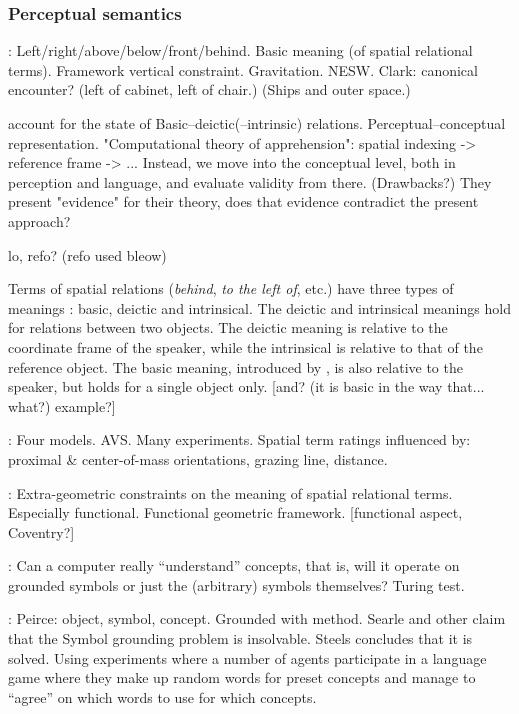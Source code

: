 \documentclass[11pt, a4paper]{article}
\begin{document}
\subsubsection{Perceptual semantics}

\cite{Garnhamunifiedtheorymeaning1989}:
Left/right/above/below/front/behind.
Basic meaning (of spatial relational terms).
Framework vertical constraint.
Gravitation. NESW.
Clark: canonical encounter? (left of cabinet, left of chair.)
(Ships and outer space.)

\cite{LoganComputationalAnalysisApprehension1996} account for the state of 
Basic–deictic(–intrinsic) relations.
Perceptual–conceptual representation.
"Computational theory of apprehension": spatial indexing -> reference frame -> ... Instead, we move into the conceptual level, both in perception and language, and evaluate validity from there.
(Drawbacks?)
They present "evidence" for their theory, does that evidence contradict the present approach?

lo, refo? (refo used bleow)

Terms of spatial relations (\textit{behind}, \textit{to the left of}, etc.) have three types of meanings \citep{Garnhamunifiedtheorymeaning1989}: basic, deictic and intrinsical.
The deictic and intrinsical meanings hold for relations between two objects.
The deictic meaning is relative to the coordinate frame of the speaker, while the intrinsical is relative to that of the reference object.
The basic meaning, introduced by \cite{Garnhamunifiedtheorymeaning1989}, is also relative to the speaker, but holds for a single object only.
[and? (it is basic in the way that... what?) example?]

\cite{RegierGroundingspatiallanguage2001a}:
Four models. AVS.
Many experiments.
Spatial term ratings influenced by: proximal \& center-of-mass orientations, grazing line, distance.

\cite{CoventryClassificationExtrageometricInfluences2004}:
Extra-geometric constraints on the meaning of spatial relational terms.
Especially functional.
Functional geometric framework.
[functional aspect, Coventry?]

\cite{HarnadSymbolGroundingProblem1990}:
Can a computer really ``understand'' concepts, that is, will it operate on grounded symbols or just the (arbitrary) symbols themselves?
Turing test.

\cite{SteelsSymbolGroundingProblem2007}:
Peirce: object, symbol, concept. Grounded with method.
Searle and other claim that the Symbol grounding problem is insolvable.
Steels concludes that it is solved.
Using experiments where a number of agents participate in a language game where they make up random words for preset concepts and manage to ``agree'' on which words to use for which concepts.
\end{document}
